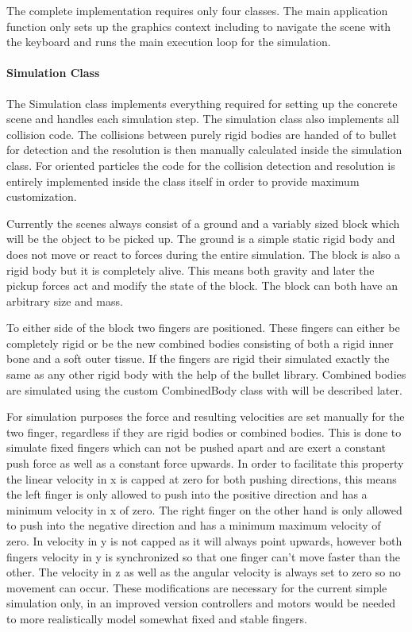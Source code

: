 The complete implementation requires only four classes. The main application function only sets up the graphics context including to navigate the scene with the keyboard and runs the main execution loop for the simulation.

\paragraph{Simulation Class}
The Simulation class implements everything required for setting up the concrete scene and handles each simulation step. The simulation class also implements all collision code. The collisions between purely rigid bodies are handed of to bullet for detection and the resolution is then manually calculated inside the simulation class. For oriented particles the code for the collision detection and resolution is entirely implemented inside the class itself in order to provide maximum customization.

Currently the scenes always consist of a ground and a variably sized block which will be the object to be picked up. The ground is a simple static rigid body and does not move or react to forces during the entire simulation. The block is also a rigid body but it is completely alive. This means both gravity and later the pickup forces act and modify the state of the block. The block can both have an arbitrary size and mass.

To either side of the block two fingers are positioned. These fingers can either be completely rigid or be the new combined bodies consisting of both a rigid inner bone and a soft outer tissue. If the fingers are rigid their simulated exactly the same as any other rigid body with the help of the bullet library. Combined bodies are simulated using the custom CombinedBody class with will be described later.

For simulation purposes the force and resulting velocities are set manually for the two finger, regardless if they are rigid bodies or combined bodies. This is done to simulate fixed fingers which can not be pushed apart and are exert a constant push force as well as a constant force upwards. In order to facilitate this property the linear velocity in x is capped at zero for both pushing directions, this means the left finger is only allowed to push into the positive direction and has a minimum velocity in x of zero. The right finger on the other hand is only allowed to push into the negative direction and has a minimum maximum velocity of zero. In velocity in y is not capped as it will always point upwards, however both fingers velocity in y is synchronized so that one finger can't move faster than the other. The velocity in z as well as the angular velocity is always set to zero so no movement can occur. These modifications are necessary for the current simple simulation only, in an improved version controllers and motors would be needed to more realistically model somewhat fixed and stable fingers.

